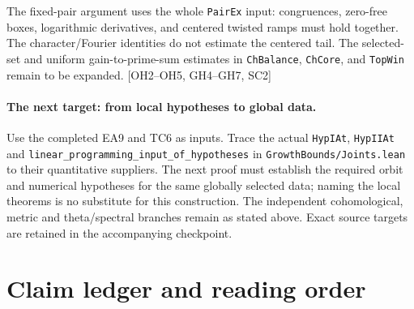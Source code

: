 \documentclass[11pt,a4paper]{article}
\numberwithin{equation}{section}
\theoremstyle{remark}\newtheorem{remark}[theorem]{Remark}
\begin{document}
\begin{description}[style=nextline]
\item[Simultaneous prime selection and the centered target.]
The fixed-pair argument uses the whole \texttt{PairEx} input: congruences, zero-free boxes, logarithmic derivatives, and centered twisted ramps must hold together. The character/Fourier identities do not estimate the centered tail. The selected-set and uniform gain-to-prime-sum estimates in \texttt{ChBalance}, \texttt{ChCore}, and \texttt{TopWin} remain to be expanded. \textsf{[OH2--OH5, GH4--GH7, SC2]}
\end{description}

\paragraph{The next target: from local hypotheses to global data.}
Use the completed EA9 and TC6 as inputs. Trace the actual
\texttt{HypIAt}, \texttt{HypIIAt} and
\texttt{linear\_programming\_input\_of\_hypotheses} in
\texttt{GrowthBounds/Joints.lean} to their quantitative suppliers.
The next proof must establish the required orbit and numerical
hypotheses for the same globally selected data; naming the local
theorems is no substitute for this construction.
The independent cohomological, metric and theta/spectral branches
remain as stated above. Exact source targets are retained in the
accompanying checkpoint.

\section{Claim ledger and reading order}
\end{document}
